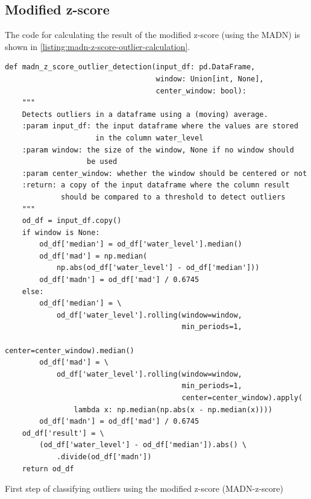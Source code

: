 \subsection{Modified z-score}
The code for calculating the result of the modified z-score (using the \ac{MADN}) is shown in \autoref{listing:madn-z-score-outlier-calculation}.
\begin{listing}
\begin{verbatim}
def madn_z_score_outlier_detection(input_df: pd.DataFrame,
                                   window: Union[int, None],
                                   center_window: bool):
    """
    Detects outliers in a dataframe using a (moving) average.
    :param input_df: the input dataframe where the values are stored
                     in the column water_level
    :param window: the size of the window, None if no window should
                   be used
    :param center_window: whether the window should be centered or not
    :return: a copy of the input dataframe where the column result
             should be compared to a threshold to detect outliers
    """
    od_df = input_df.copy()
    if window is None:
        od_df['median'] = od_df['water_level'].median()
        od_df['mad'] = np.median(
            np.abs(od_df['water_level'] - od_df['median']))
        od_df['madn'] = od_df['mad'] / 0.6745
    else:
        od_df['median'] = \
            od_df['water_level'].rolling(window=window,
                                         min_periods=1,
                                         center=center_window).median()
        od_df['mad'] = \
            od_df['water_level'].rolling(window=window,
                                         min_periods=1,
                                         center=center_window).apply(
                lambda x: np.median(np.abs(x - np.median(x))))
        od_df['madn'] = od_df['mad'] / 0.6745
    od_df['result'] = \
        (od_df['water_level'] - od_df['median']).abs() \
            .divide(od_df['madn'])
    return od_df
\end{verbatim}
\caption{First step of classifying outliers using the modified z-score (\ac{MADN}-z-score)}
\label{listing:madn-z-score-outlier-calculation}
\end{listing}

